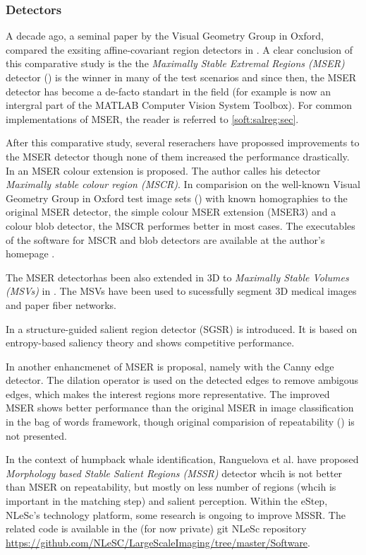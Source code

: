 \subsubsection{Detectors}
A decade ago, a seminal paper by the Visual Geometry Group in Oxford, compared the exsiting affine-covariant region detectors in \cite{Mikolajczyk:2005}. A clear conclusion of this comparative study is the the  {\em  Maximally Stable Extremal Regions (MSER)} detector (\cite{Matas2002BMVC}) is the winner in many of the test scenarios and since then, the MSER detector has become a de-facto standart in the field (for example is now an intergral part of the MATLAB Computer Vision System Toolbox). For common implementations of MSER, the reader is referred to \ref{soft:salreg:sec}.

After this comparative study, several reserachers have propossed improvements to the MSER detector though none of them increased the performance drastically. 
In \cite{Forssen07} an MSER colour extension is proposed. The author calles his detector {\em Maximally stable colour region (MSCR)}. In comparision on the well-known Visual Geometry Group in Oxford test image sets (\cite{vgg_soft_data}) with known homographies to the original MSER detector, the simple colour MSER extension (MSER3) and a colour blob detector, the MSCR performes better in most cases. The executables of the software for MSCR and blob detectors are available at the author's homepage \cite{forssen07_soft}.

The MSER detectorhas been also extended in 3D to {\em Maximally Stable Volumes (MSVs)} in \cite{DonoserB06}. The MSVs have been used to sucessfully segment 3D medical images and paper fiber networks.

In \cite{Fan08} a structure-guided salient region detector (SGSR) is introduced. It is based on entropy-based saliency theory and shows competitive performance.

In \cite{Wang14} another enhancmenet of MSER is proposal, namely with the Canny edge detector. The dilation operator is used on the detected edges to remove ambigous edges, which makes the interest regions more representative. The improved MSER shows better performance than the original MSER in image classification in the bag of words framework, though original comparision of repeatability (\cite{Mikolajczyk:2005}) is not presented. 

In the context of humpback whale identification, Ranguelova et al. \cite{RangMSSR06, RangHumpb06} have proposed {\em Morphology based Stable Salient Regions (MSSR) } detector whcih is not better than MSER on repeatability, but mostly on less number of regions (whcih is important in the matching step) and salient perception. Within the eStep, NLeSc's technology platform, some research is ongoing to improve MSSR. The related code is available in the (for now private) git NLeSc repository \url{https://github.com/NLeSC/LargeScaleImaging/tree/master/Software}.

